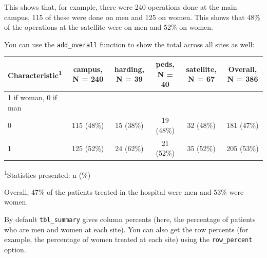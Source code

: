 \documentclass[]{book}
\newenvironment{Shaded}{\begin{snugshade}}{\end{snugshade}}
\newcommand{\CommentTok}[1]{\textcolor[rgb]{0.56,0.35,0.01}{\textit{#1}}}
\newcommand{\DataTypeTok}[1]{\textcolor[rgb]{0.13,0.29,0.53}{#1}}
\newcommand{\KeywordTok}[1]{\textcolor[rgb]{0.13,0.29,0.53}{\textbf{#1}}}
\newcommand{\NormalTok}[1]{#1}
\newcommand{\OperatorTok}[1]{\textcolor[rgb]{0.81,0.36,0.00}{\textbf{#1}}}
\newcommand{\OtherTok}[1]{\textcolor[rgb]{0.56,0.35,0.01}{#1}}
\newcommand{\StringTok}[1]{\textcolor[rgb]{0.31,0.60,0.02}{#1}}
\begin{document}
This shows that, for example, there were 240 operations done at the main
campus, 115 of these were done on men and 125 on women. This shows that
48\% of the operations at the satellite were on men and 52\% on women.

You can use the \texttt{add\_overall} function to show the total across
all sites as well:

\begin{Shaded}
\end{Shaded}

\captionsetup[table]{labelformat=empty,skip=1pt}
\begin{longtable}{lccccc}
\toprule
\textbf{Characteristic}\textsuperscript{1} & \textbf{campus}, N = 240 & \textbf{harding}, N = 39 & \textbf{peds}, N = 40 & \textbf{satellite}, N = 67 & \textbf{Overall}, N = 386 \\ 
\midrule
1 if woman, 0 if man &  &  &  &  &  \\ 
0 & 115 (48\%) & 15 (38\%) & 19 (48\%) & 32 (48\%) & 181 (47\%) \\ 
1 & 125 (52\%) & 24 (62\%) & 21 (52\%) & 35 (52\%) & 205 (53\%) \\ 
\bottomrule
\end{longtable}
\vspace{-5mm}
\begin{minipage}{\linewidth}
\textsuperscript{1}Statistics presented: n (\%) \\ 
\end{minipage}

Overall, 47\% of the patients treated in the hospital were men and 53\%
were women.

By default \texttt{tbl\_summary} gives column percents (here, the
percentage of patients who are men and women at each site). You can also
get the row percents (for example, the percentage of women treated at
each site) using the \texttt{row\_percent} option.
\end{document}
